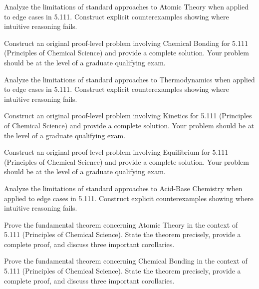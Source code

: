 \documentclass[12pt,a4paper]{exam}
\begin{document}
\begin{questions}

\question[2]
Analyze the limitations of standard approaches to Atomic Theory when applied to edge cases in 5.111. Construct explicit counterexamples showing where intuitive reasoning fails.

\vspace{0.3cm}

\question[5]
Construct an original proof-level problem involving Chemical Bonding for 5.111 (Principles of Chemical Science) and provide a complete solution. Your problem should be at the level of a graduate qualifying exam.

\vspace{0.3cm}

\question[4]
Analyze the limitations of standard approaches to Thermodynamics when applied to edge cases in 5.111. Construct explicit counterexamples showing where intuitive reasoning fails.

\vspace{0.3cm}

\question[6]
Construct an original proof-level problem involving Kinetics for 5.111 (Principles of Chemical Science) and provide a complete solution. Your problem should be at the level of a graduate qualifying exam.

\vspace{0.3cm}

\question[2]
Construct an original proof-level problem involving Equilibrium for 5.111 (Principles of Chemical Science) and provide a complete solution. Your problem should be at the level of a graduate qualifying exam.

\vspace{0.3cm}

\question[5]
Analyze the limitations of standard approaches to Acid-Base Chemistry when applied to edge cases in 5.111. Construct explicit counterexamples showing where intuitive reasoning fails.

\vspace{0.3cm}

\question[7]
Prove the fundamental theorem concerning Atomic Theory in the context of 5.111 (Principles of Chemical Science). State the theorem precisely, provide a complete proof, and discuss three important corollaries.

\vspace{0.3cm}

\question[3]
Prove the fundamental theorem concerning Chemical Bonding in the context of 5.111 (Principles of Chemical Science). State the theorem precisely, provide a complete proof, and discuss three important corollaries.


\end{questions}
\end{document}
